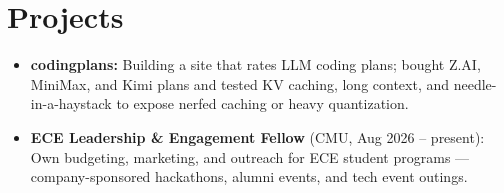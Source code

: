 \documentclass[11pt, letterpaper]{article}
\begin{document}
\section{Projects}
\begin{itemize}
  \item \textbf{codingplans:} Building a site that rates LLM coding plans; bought Z.AI, MiniMax, and Kimi plans and tested KV caching, long context, and needle-in-a-haystack to expose nerfed caching or heavy quantization.
  \item \textbf{ECE Leadership \& Engagement Fellow} (CMU, Aug 2026 -- present): Own budgeting, marketing, and outreach for ECE student programs --- company-sponsored hackathons, alumni events, and tech event outings.
\end{itemize}
\end{document}
